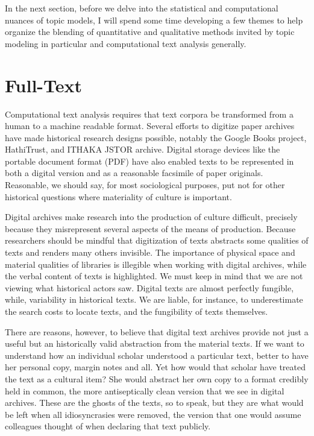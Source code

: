 \documentclass[]{book}
\theoremstyle{definition}
\theoremstyle{definition}
\theoremstyle{definition}
\theoremstyle{remark}
\begin{document}
In the next section, before we delve into the statistical and
computational nuances of topic models, I will spend some time developing
a few themes to help organize the blending of quantitative and
qualitative methods invited by topic modeling in particular and
computational text analysis generally.

\hypertarget{full-text}{%
\section{Full-Text}\label{full-text}}

Computational text analysis requires that text corpora be transformed
from a human to a machine readable format. Several efforts to digitize
paper archives have made historical research designs possible, notably
the Google Books project, HathiTrust, and ITHAKA JSTOR archive. Digital
storage devices like the portable document format (PDF) have also
enabled texts to be represented in both a digital version and as a
reasonable facsimile of paper originals. Reasonable, we should say, for
most sociological purposes, put not for other historical questions where
materiality of culture is important.
\citep[149]{Schreibman2014NonConsumptive}

Digital archives make research into the production of culture difficult,
precisely because they misrepresent several aspects of the means of
production. Because researchers should be mindful that digitization of
texts abstracts some qualities of texts and renders many others
invisible. The importance of physical space and material qualities of
libraries is illegible when working with digital archives, while the
verbal content of texts is highlighted. We must keep in mind that we are
not viewing what historical actors saw. Digital texts are almost
perfectly fungible, while, variability in historical texts. We are
liable, for instance, to underestimate the search costs to locate texts,
and the fungibility of texts themselves.

There are reasons, however, to believe that digital text archives
provide not just a useful but an historically valid abstraction from the
material texts. If we want to understand how an individual scholar
understood a particular text, better to have her personal copy, margin
notes and all. Yet how would that scholar have treated the text as a
cultural item? She would abstract her own copy to a format credibly held
in common, the more antiseptically clean version that we see in digital
archives. These are the ghosts of the texts, so to speak, but they are
what would be left when all idiosyncrasies were removed, the version
that one would assume colleagues thought of when declaring that text
publicly.
\end{document}

